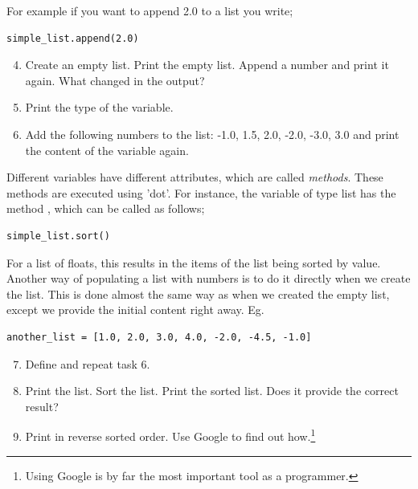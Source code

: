 \documentclass{article}
\begin{document}
For example if you want to append 2.0 to a list you write;

\begin{lstlisting}
simple_list.append(2.0)
\end{lstlisting}

\begin{enumerate}
  \setcounter{enumi}{3}
  \item Create an empty list.
    Print the empty list.
    Append a number and print it again.
    What changed in the output?

  \item Print the type of the variable.

  \item Add the following numbers to the list: -1.0, 1.5, 2.0, -2.0, -3.0, 3.0 and
    print the content of the variable again.
\end{enumerate}


Different variables have different attributes, which are called {\em methods}.
These methods are executed using 'dot'.
For instance,
the variable of type list has the method ,
which can be called as follows;

\begin{lstlisting}
simple_list.sort()
\end{lstlisting}

For a list of floats, this results in the items of the list being sorted by value.\\

Another way of populating a list with numbers is to do it directly when
we create the list.
This is done almost the same way as when we created the empty list, except we
provide the initial content right away. Eg.

\begin{lstlisting}
another_list = [1.0, 2.0, 3.0, 4.0, -2.0, -4.5, -1.0]
\end{lstlisting}


\begin{enumerate}
  \setcounter{enumi}{6}
  \item Define  and repeat task 6.

  \item Print the list. Sort the list. Print the sorted list.
  Does it provide the correct result?

  \item Print  in reverse sorted order.
    Use Google to find out how.\footnote{Using Google is
    by far the most important tool as a programmer.}
\end{enumerate}
\end{document}
